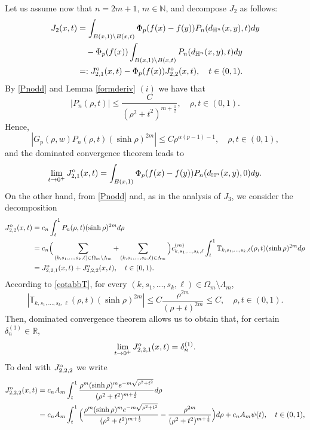\documentclass[a4paper,10pt, reqno]{amsart}
\theoremstyle{definition}
\theoremstyle{remark}
\numberwithin{equation}{section}
\begin{document}
{Let us assume now that $n=2m+1$, $m\in \mathbb N$, and decompose $J_2$ as follows: 
\begin{align}\label{J2decomp}
J_2(x,t)&=\int_{B(x,1)\setminus B(x,t)}\Phi _p(f(x)-f(y))P_n(d_{\mathbb H^n}(x,y),t)dy\nonumber\\
&\quad -\Phi_p(f(x))\int_{B(x,1)\setminus B(x,t)}P_n(d_{\mathbb H^n}(x,y),t)dy\nonumber\\
&=:J_{2,1}^{\rm o}(x,t)-\Phi _p(f(x))J_{2,2}^{\rm o}(x,t),\quad t\in (0,1).
\end{align}By \eqref{Pnodd} and Lemma \ref{formderiv} $(i)$ we have that
$$
|P_n(\rho ,t)|\leq \frac{C}{(\rho^2+t^2)^{m+\frac{1}{2}}},\quad \rho, t\in (0,1).
$$
Hence, 
$$
|G_p(\rho,w)P_n(\rho , t)(\sinh\rho )^{2m}|\leq C\rho ^{\alpha (p-1)-1},\quad \rho, t\in (0,1),
$$
and the dominated convergence theorem leads to
\begin{equation}\label{J21}
\lim_{t\rightarrow 0^+}J_{2,1}^{\rm o}(x,t)=\int_{B(x,1)}\Phi _p(f(x)-f(y))P_n(d_{\mathbb H^n}(x,y),0)dy.    
\end{equation}
On the other hand, from \eqref{Pnodd} and, as in the analysis of $J_3$, we consider the decomposition
\begin{align}\label{J22decom}
J_{2,2}^{\rm o}(x,t)&=c_n\int_t^1P_n(\rho ,t)(\sinh \rho )^{2m}d\rho\nonumber\\
&=c_n\Big(\sum_{(k,s_1,\ldots,s_k,\ell)\in \Omega_m\setminus \Lambda _m}+\sum_{(k,s_1,\ldots,s_k,\ell)\in \Lambda _m}\Big)c_{k,s_1,\ldots, s_k,\ell}^{(m)}\int_t^1\mathbb T_{k,s_1,\ldots,s_k,\ell}(\rho, t)(\sinh \rho )^{2m}d\rho\nonumber\\
&=J_{2,2,1}^{\rm o}(x,t)+J_{2,2,2}^{\rm o}(x,t),\quad t\in (0,1).
\end{align}
According to \eqref{cotabbT}, for every $(k,s_1,\ldots, s_k,\ell)\in \Omega_m\setminus \Lambda _m$,
$$
|\mathbb T_{k,s_1,\ldots, s_k,\ell}(\rho, t)(\sinh \rho )^{2m}|\leq C\frac{\rho ^{2m}}{(\rho +t)^{2m}}\leq C,\quad \rho, t\in (0,1).
$$
Then, dominated convergence theorem allows us to obtain that, for certain $\delta_n^{(1)}\in \mathbb R$, 
\begin{equation}\label{J221odd}
\lim_{t\rightarrow 0^+}J_{2,2,1}^{\rm o}(x,t)=\delta_n^{(1)}.
\end{equation}
To deal with $J_{2,2,2}^{\rm o}$ we write
\begin{align*}
    J_{2,2,2}^{\rm o}(x,t)&=c_nA_m\int_t^1\frac{\rho ^m(\sinh \rho )^me^{-m\sqrt{\rho ^2+t^2}}}{(\rho ^2+t^2)^{m+\frac{1}{2}}}d\rho\\
    &=c_nA_m\int_t^1\Big(\frac{\rho ^m(\sinh \rho )^me^{-m\sqrt{\rho ^2+t^2}}}{(\rho ^2+t^2)^{m+\frac{1}{2}}}-\frac{\rho ^{2m}}{(\rho ^2+t^2)^{m+\frac{1}{2}}}\Big)d\rho+c_nA_m\psi (t),\quad t\in (0,1),

\end{align*}}
\end{document}
